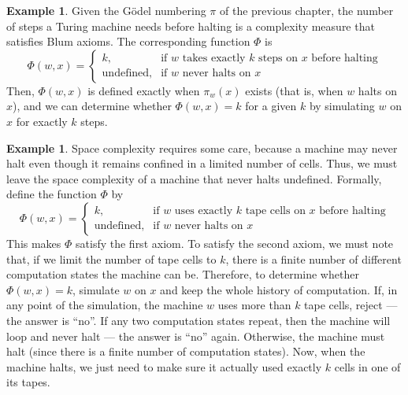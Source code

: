 \documentclass[12pt]{article}
\theoremstyle{definition}
\newtheorem{example}[definition]{Example}
\begin{document}
\begin{example}
    Given the Gödel numbering $\pi$ of the previous chapter,
    the number of steps a Turing machine needs before halting
    is a complexity measure that satisfies Blum axioms.
    The corresponding function $\Phi$ is
    \begin{equation*}
        \Phi(w, x) = \begin{cases}
            k, &\text{if $w$ takes exactly $k$ steps on $x$ before halting} \\
            \text{undefined}, &\text{if $w$ never halts on $x$}
        \end{cases}
    \end{equation*}
    Then, $\Phi(w, x)$ is defined exactly when $\pi_w(x)$ exists
    (that is, when $w$ halts on $x$),
    and we can determine whether $\Phi(w, x) = k$ for a given $k$
    by simulating $w$ on $x$ for exactly $k$ steps.
\end{example}

\begin{example}
    Space complexity requires some care,
    because a machine may never halt even though it remains confined
    in a limited number of cells.
    Thus, we must leave the space complexity of a machine that never halts undefined.
    Formally, define the function $\Phi$ by
    \begin{equation*}
        \Phi(w, x) = \begin{cases}
            k, &\text{if $w$ uses exactly $k$ tape cells on $x$ before halting} \\
            \text{undefined}, &\text{if $w$ never halts on $x$}
        \end{cases}
    \end{equation*}
    This makes $\Phi$ satisfy the first axiom.
    To satisfy the second axiom,
    we must note that,
    if we limit the number of tape cells to $k$,
    there is a finite number of different computation states
    the machine can be.
    Therefore,
    to determine whether $\Phi(w, x) = k$,
    simulate $w$ on $x$ and keep the whole history of computation.
    If, in any point of the simulation,
    the machine $w$ uses more than $k$ tape cells,
    reject --- the answer is ``no''.
    If any two computation states repeat,
    then the machine will loop and never halt
    --- the answer is ``no'' again.
    Otherwise, the machine must halt
    (since there is a finite number of computation states).
    Now, when the machine halts,
    we just need to make sure it actually used exactly $k$ cells in one of its tapes.
\end{example}
\end{document}
